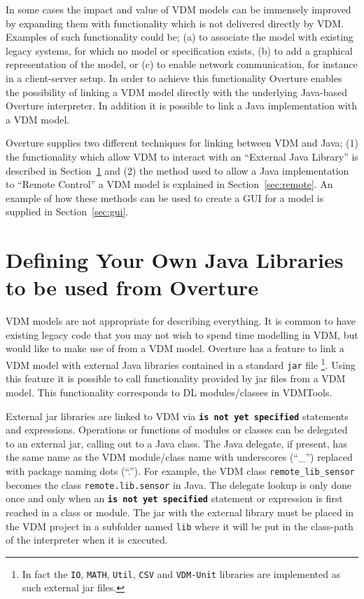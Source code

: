 \documentclass{overturerepchap}
\begin{document}
In some cases the impact and value of VDM models can be immensely
improved by expanding them with functionality which is not delivered
directly by VDM. Examples of such functionality could be; (a) to
associate the model with existing legacy systems, for which no model
or specification exists, (b) to add a graphical representation of the
model, or (c) to enable network communication, for instance in a
client-server setup.  In order to achieve this functionality Overture
enables the possibility of linking a VDM model directly with the
underlying Java-based Overture interpreter. In addition it is possible
to link a
Java implementation with a VDM model.

Overture supplies two different techniques for linking between VDM and Java; (1) the functionality which allow VDM to interact with an ``External Java Library'' is described in Section~\ref{sec:javalibs} and (2) the method used to allow a Java implementation to ``Remote Control'' a VDM model is explained in Section~\ref{sec:remote}. An example of how these methods can be used to create a GUI for a model is supplied in Section~\ref{sec:gui}.

\section{Defining Your Own Java Libraries to be used from Overture}\label{sec:javalibs}

VDM models are not appropriate for describing everything. It is common
to have existing legacy code that you may not
wish to spend time modelling in VDM, but would like to make use of
from a VDM model. Overture has a feature to link a VDM
model with external Java libraries contained in a standard \texttt{jar} file
\footnote{In fact the \texttt{IO}, \texttt{MATH}, \texttt{Util},
  \texttt{CSV} and \texttt{VDM-Unit} libraries are implemented as such
external jar files.}.
Using this feature it is possible
to call functionality provided by jar files from a VDM model. This functionality
corresponds to DL modules/classes in VDMTools\cite{DLMan}.

External jar libraries are linked to VDM via
{\textbf\texttt{is not yet specified}} statements and expressions. Operations
or functions of modules or classes can be delegated to an external
jar, calling out to a Java class. The Java delegate, if present, has
the same name as the VDM
module/class name with underscores (``\_'') replaced with package naming
dots (``.''). For example, the VDM class \texttt{remote\_lib\_sensor} becomes
the class \texttt{remote.lib.sensor} in Java. The delegate lookup is only done once and
only when an  {\textbf\texttt{is not yet specified}} statement or expression is first
reached in a class or module. The jar with the external library must be placed in
the VDM project in a subfolder named \texttt{lib} where it will be put in the
class-path of the interpreter when it is executed.
\end{document}
